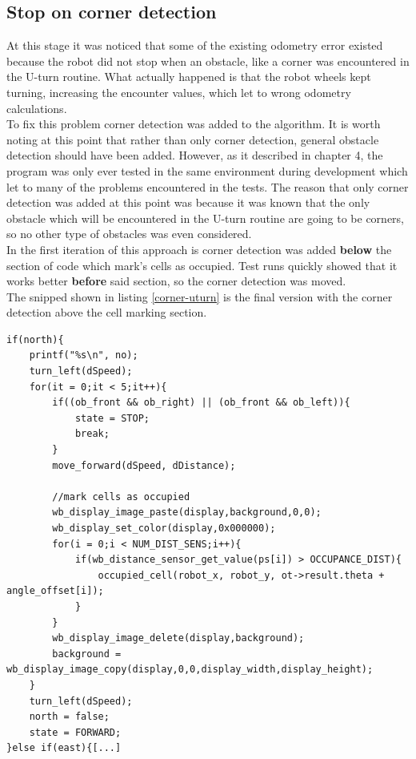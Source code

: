 \subsection{Stop on corner detection}
At this stage it was noticed that some of the existing odometry error existed because the robot did not stop when an obstacle, like a corner was encountered in the U-turn routine.
What actually happened is that the robot wheels kept turning, increasing the encounter values, which let to wrong odometry calculations. \\
To fix this problem corner detection was added to the algorithm.
It is worth noting at this point that rather than only corner detection, general obstacle detection should have been added. However, as it described in chapter 4, the program was only ever tested in the same environment during development which let to many of the problems encountered in the tests.
The reason that only corner detection was added at this point was because it was known that the only obstacle which will be encountered in the U-turn routine are going to be corners, so no other type of obstacles was even considered.\\[3ex]

In the first iteration of this approach is corner detection was added \textbf{below} the section of code which mark's cells as occupied. Test runs quickly showed that it works better \textbf{before} said section, so the corner detection was moved.\\
The snipped shown in listing \ref{corner-uturn} is the final version with the corner detection above the cell marking section.

\begin{lstlisting}[caption={Corner detection added to the U-turn routine}, label={corner-uturn}]
if(north){
    printf("%s\n", no);
    turn_left(dSpeed);
    for(it = 0;it < 5;it++){
        if((ob_front && ob_right) || (ob_front && ob_left)){
            state = STOP;
            break;
        }
        move_forward(dSpeed, dDistance);

        //mark cells as occupied
        wb_display_image_paste(display,background,0,0);
        wb_display_set_color(display,0x000000);
        for(i = 0;i < NUM_DIST_SENS;i++){
            if(wb_distance_sensor_get_value(ps[i]) > OCCUPANCE_DIST){
                occupied_cell(robot_x, robot_y, ot->result.theta + angle_offset[i]);
            }
        }
        wb_display_image_delete(display,background);
        background = wb_display_image_copy(display,0,0,display_width,display_height);
    }
    turn_left(dSpeed);
    north = false;
    state = FORWARD;
}else if(east){[...]
\end{lstlisting}

